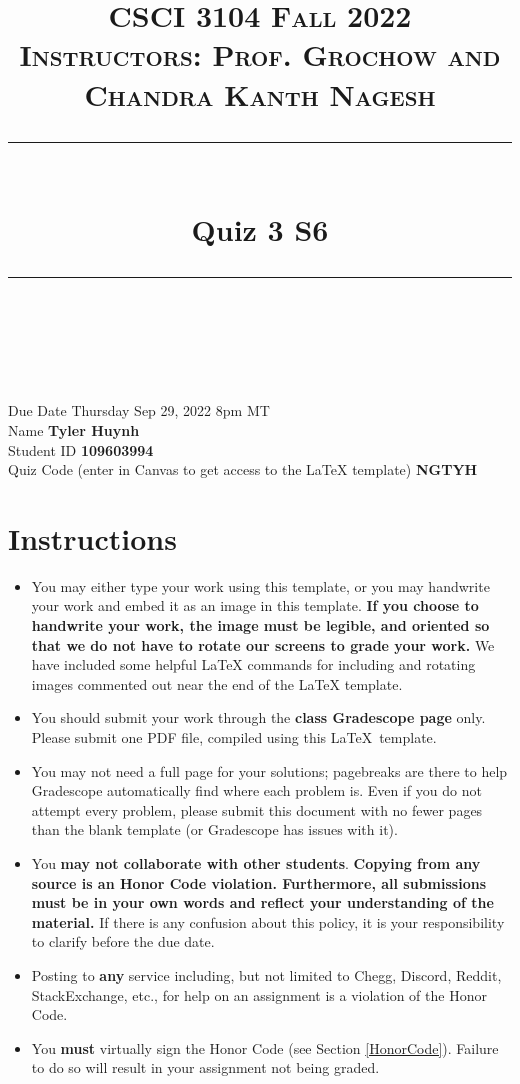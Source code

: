 \documentclass[11pt]{article}
\title{
\normalfont \normalsize 
\textsc{CSCI 3104 Fall 2022 \\ 
Instructors: Prof. Grochow and Chandra Kanth Nagesh} \\
[10pt] 
\rule{\linewidth}{0.5pt} \\[6pt] 
\huge Quiz 3 S6 \\
\rule{\linewidth}{2pt}  \\[10pt]
}
\date{}
\theoremstyle{definition}
\theoremstyle{definition}
\theoremstyle{definition}
\begin{document}

\maketitle


\noindent
Due Date \dotfill Thursday Sep 29, 2022 8pm MT \\
Name \dotfill \textbf{Tyler Huynh} \\
Student ID \dotfill \textbf{109603994} \\
Quiz Code (enter in Canvas to get access to the LaTeX template) \dotfill \textbf{NGTYH}


\tableofcontents

\section*{Instructions}
 \begin{itemize}
	\item You may either type your work using this template, or you may handwrite your work and embed it as an image in this template. \textbf{If you choose to handwrite your work, the image must be legible, and oriented so that we do not have to rotate our screens to grade your work.} We have included some helpful LaTeX commands for including and rotating images commented out near the end of the LaTeX template.
	\item You should submit your work through the \textbf{class Gradescope page} only. Please submit one PDF file, compiled using this \LaTeX \ template.
	\item You may not need a full page for your solutions; pagebreaks are there to help Gradescope automatically find where each problem is. Even if you do not attempt every problem, please submit this document with no fewer pages than the blank template (or Gradescope has issues with it).

	\item You \textbf{may not collaborate with other students}. \textbf{Copying from any source is an Honor Code violation. Furthermore, all submissions must be in your own words and reflect your understanding of the material.} If there is any confusion about this policy, it is your responsibility to clarify before the due date. 

	\item Posting to \textbf{any} service including, but not limited to Chegg, Discord, Reddit, StackExchange, etc., for help on an assignment is a violation of the Honor Code.

	\item You \textbf{must} virtually sign the Honor Code (see Section \ref{HonorCode}). Failure to do so will result in your assignment not being graded.
\end{itemize}
\end{document}
